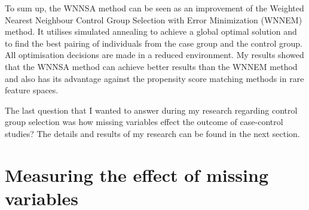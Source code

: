         \vspace{0.5cm}

        To sum up, the WNNSA method can be seen as an improvement of the Weighted Nearest Neighbour Control Group Selection with Error Minimization (WNNEM) method. It utilises simulated annealing to achieve a global optimal solution and to find the best pairing of individuals from the case group and the control group. All optimisation decisions are made in a reduced environment. My results showed that the WNNSA method can achieve better results than the WNNEM method and also has its advantage against the propensity score matching methods in rare feature spaces.
							

        \vspace{0.5cm}

        The last question that I wanted to answer during my research regarding control group selection was how missing variables effect the outcome of case-control studies? The details and results of my research can be found in the next section.
        
		\section{Measuring the effect of missing variables}
		\label{sec:missing}
								
